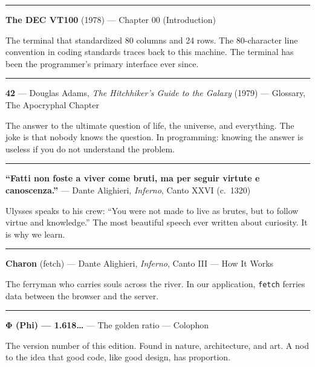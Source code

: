 \documentclass[11pt,a4paper,oneside]{book}
\begin{document}
\begin{center}\rule{0.5\linewidth}{0.5pt}\end{center}

\textbf{The DEC VT100} (1978) --- Chapter 00 (Introduction)

The terminal that standardized 80 columns and 24 rows. The
80-character line convention in coding standards traces back to
this machine. The terminal has been the programmer's primary
interface ever since.

\begin{center}\rule{0.5\linewidth}{0.5pt}\end{center}

\textbf{42} --- Douglas Adams, \emph{The Hitchhiker's Guide to
the Galaxy} (1979) --- Glossary, The Apocryphal Chapter

The answer to the ultimate question of life, the universe, and
everything. The joke is that nobody knows the question. In
programming: knowing the answer is useless if you do not
understand the problem.

\begin{center}\rule{0.5\linewidth}{0.5pt}\end{center}

\textbf{``Fatti non foste a viver come bruti, ma per seguir
virtute e canoscenza.''} --- Dante Alighieri, \emph{Inferno},
Canto XXVI (c.~1320)

Ulysses speaks to his crew: ``You were not made to live as
brutes, but to follow virtue and knowledge.'' The most beautiful
speech ever written about curiosity. It is why we learn.

\begin{center}\rule{0.5\linewidth}{0.5pt}\end{center}

\textbf{Charon} (fetch) --- Dante Alighieri, \emph{Inferno},
Canto III --- How It Works

The ferryman who carries souls across the river. In our
application, \texttt{fetch} ferries data between the browser and
the server.

\begin{center}\rule{0.5\linewidth}{0.5pt}\end{center}

\textbf{Φ (Phi) --- 1.618\ldots{}} --- The golden ratio ---
Colophon

The version number of this edition. Found in nature,
architecture, and art. A nod to the idea that good code, like
good design, has proportion.
\end{document}
